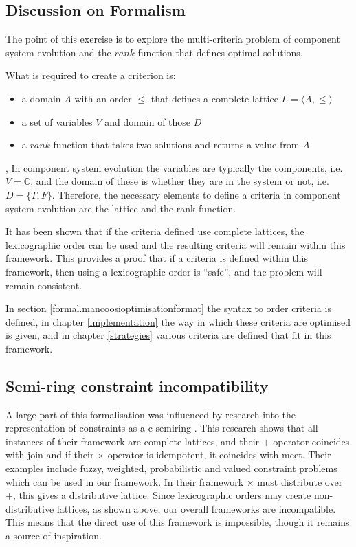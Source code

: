 \subsection{Discussion on Formalism}
The point of this exercise is to explore the multi-criteria problem of component system evolution and the $rank$ function that defines optimal solutions.

What is required to create a criterion is: 
\begin{itemize}
  \item a domain $A$ with an order $\leq$ that defines a complete lattice $L = \langle A, \leq \rangle$
  \item a set of variables $V$ and domain of those $D$
  \item a $rank$ function that takes two solutions and returns a value from $A$
\end{itemize}, 
In component system evolution the variables are typically the components, i.e. $ V = \mathbb{C}$, and the domain of these is whether they are in the system or not, i.e. $D = \{T,F\}$.
Therefore, the necessary elements to define a criteria in component system evolution are the lattice and the rank function.

It has been shown that if the criteria defined use complete lattices, the lexicographic order can be used and the resulting criteria will remain within this framework. 
This provides a proof that if a criteria is defined within this framework, then using a lexicographic order is ``safe'', and the problem will remain consistent.

In section \ref{formal.mancoosioptimisationformat} the syntax to order criteria is defined, 
in chapter \ref{implementation} the way in which these criteria are optimised is given,
and in chapter \ref{strategies} various criteria are defined that fit in this framework.

\subsection{Semi-ring constraint incompatibility}
A large part of this formalisation was influenced by research into the representation of constraints as a c-semiring \citep{Bistarelli1997}.
This research shows that all instances of their framework are complete lattices, and their $+$ operator coincides with join
and if their $\times$ operator is idempotent, it coincides with meet.
Their examples include fuzzy, weighted, probabilistic and valued constraint problems which can be used in our framework.
In their framework $\times$ must distribute over $+$, this gives a distributive lattice.
Since lexicographic orders may create non-distributive lattices, as shown above, our overall frameworks are incompatible.
This means that the direct use of this framework is impossible, though it remains a source of inspiration.

